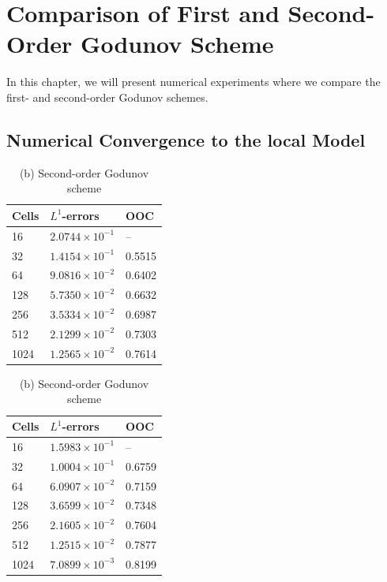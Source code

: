 \chapter{Comparison of First and Second-Order Godunov Scheme}\label{cha:chapter_7}
In this chapter, we will present numerical experiments where we compare the first- and second-order Godunov schemes.
\section{Numerical Convergence to the local Model}
\begin{table}[H]
    \centering
    \begin{minipage}{0.45\textwidth}
        \centering
        \begin{tabular}{ |p{1.5cm}||p{2.2cm}| |p{1.5cm}| }
            \hline
            \textbf{Cells } & $L^{1}$-\textbf{errors} & \textbf{OOC} \\
            \hline
            16              & $2.0744 \times 10^{-1}$ & --           \\
            32              & $1.4154 \times 10^{-1}$ & 0.5515       \\
            64              & $9.0816 \times 10^{-2}$ & 0.6402       \\
            128             & $5.7350 \times 10^{-2}$ & 0.6632       \\
            256             & $3.5334 \times 10^{-2}$ & 0.6987       \\
            512             & $2.1299 \times 10^{-2}$ & 0.7303       \\
            1024            & $1.2565 \times 10^{-2}$ & 0.7614       \\
            \hline
        \end{tabular}
        \caption*{(a) First-order Godunov scheme}
    \end{minipage}
    \hfill
    \begin{minipage}{0.5\textwidth}
        \centering
        \begin{tabular}{ |p{1.5cm}||p{2.2cm}| |p{1.5cm}| }
            \hline
            \textbf{Cells } & $L^{1}$-\textbf{errors} & \textbf{OOC} \\
            \hline
            16              & $1.5983 \times 10^{-1}$ & --           \\
            32              & $1.0004 \times 10^{-1}$ & 0.6759       \\
            64              & $6.0907 \times 10^{-2}$ & 0.7159       \\
            128             & $3.6599 \times 10^{-2}$ & 0.7348       \\
            256             & $2.1605 \times 10^{-2}$ & 0.7604       \\
            512             & $1.2515 \times 10^{-2}$ & 0.7877       \\
            1024            & $7.0899 \times 10^{-3}$ & 0.8199       \\
            \hline
        \end{tabular}
        \caption*{(b) Second-order Godunov scheme}
    \end{minipage}


\end{table}
